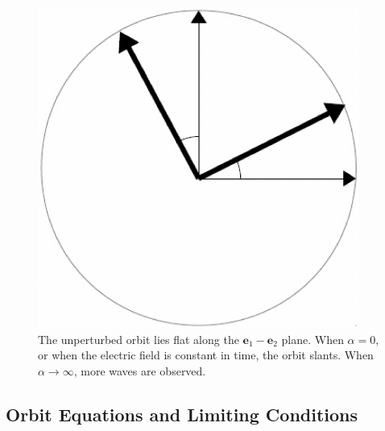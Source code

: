 \documentclass[twocolumn,showpacs,preprintnumbers,amsmath,amssymb]{revtex4}
\begin{document}
\begin{figure}
 \centering
  \includegraphics[page=4, scale=0.85]{rydberg_version2_graphics.pdf}
\caption{The unperturbed orbit lies flat along the $\mathbf{e}_1-\mathbf{e}_2$ plane. When $\alpha = 0$, or when the electric field is constant in time, the orbit slants. When $\alpha \rightarrow \infty$, more waves are observed.}
\label{fig:large}
\end{figure}

\subsection{Orbit Equations and Limiting Conditions}
\end{document}

